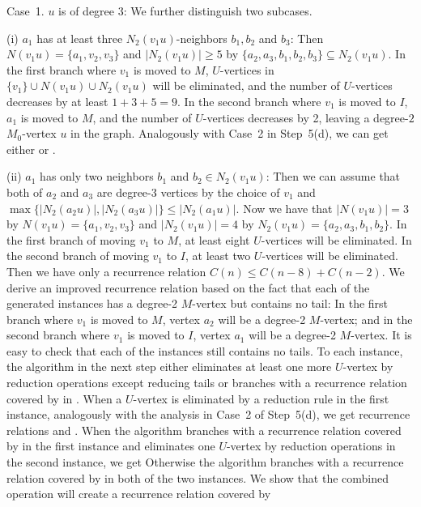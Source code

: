 \documentclass{elsart_TR2}
\begin{document}
\vspace{-0mm}\vspace{-0mm}

Case~1. $u$ is of degree 3: We further distinguish two subcases.

(i)  $a_1$ has at least three $N_2(v_1u)$-neighbors $b_1, b_2$ and $b_3$:
Then
$N(v_1u)=\{a_1,v_2,v_3\}$  and $|N_2(v_1u)|\geq 5$ by $\{a_2,a_3, b_1,b_2,b_3\}\subseteq N_2(v_1u)$.
In the  first branch where $v_1$ is moved to $M$, $U$-vertices in $\{v_1\}\cup N(v_1u)\cup N_2(v_1u)$ will be eliminated,
 and the number of $U$-vertices
decreases by at least $1+3+5=9$.
In the second branch where $v_1$ is moved to $I$,  $a_1$ is moved to $M$,  and the number of $U$-vertices
decreases by 2, leaving a degree-$2$ $M_0$-vertex $u$ in the graph.
Analogously with Case~2 in Step~5(d), we can get either  or .


(ii)    $a_1$ has only two neighbors $b_1$ and $b_2\in N_2(v_1u)$:
Then  we can assume that  both of $a_2$ and $a_3$ are degree-3 vertices
by the choice of $v_1$ and $\max\{|N_2(a_2u)|,|N_2(a_3u)|\}\leq |N_2(a_1u)|$.
Now we have that  $|N(v_1u)|=3$ by $N(v_1u)=\{a_1,v_2,v_3\}$ and $|N_2(v_1u)|=4$ by $N_2(v_1u)=\{a_2,a_3, b_1,b_2\}$.
In the first branch of moving $v_1$ to $M$, at least eight $U$-vertices   will be eliminated.
In the second branch of moving $v_1$ to $I$,  at least two $U$-vertices   will be eliminated.
Then we have only a recurrence relation $C(n)\leq C(n-8)+C(n-2)$. We derive an improved recurrence relation
based on the fact that each of the generated instances has  a degree-2 $M$-vertex
but contains no tail:
In the first branch where $v_1$ is moved to $M$,  vertex
$a_2$ will be a degree-2 $M$-vertex; and  in the second branch where $v_1$ is moved to $I$,
vertex $a_1$ will be a degree-2 $M$-vertex.
It is easy to check that each of the instances still contains no tails.
To each instance, the algorithm  in the next step
 either eliminates at least one more $U$-vertex by reduction operations except reducing tails
or
branches with a recurrence relation covered by  in .
When a  $U$-vertex is eliminated by a reduction rule in the first instance, analogously with the analysis in  Case~2 of Step~5(d),
 we get  recurrence relations
  and .
 When the algorithm branches with a recurrence relation covered by  in the first instance and eliminates one
 $U$-vertex by reduction operations in the second instance, we get
Otherwise the algorithm branches with a recurrence relation covered by  in both of the two instances.
We show that the combined operation will create a recurrence relation covered by
\end{document}
